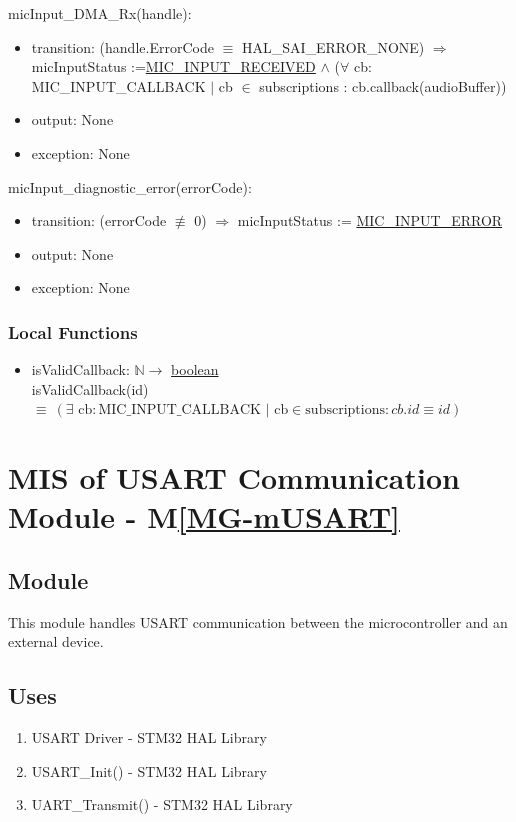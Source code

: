 \documentclass[12pt, titlepage]{article}
\newcommand{\mref}[1]{M\ref{#1}}
\begin{document}
\noindent micInput\_DMA\_Rx(handle):
\begin{itemize}
  \item transition: (handle.ErrorCode \(\equiv\) HAL\_SAI\_ERROR\_NONE)
  \(\Rightarrow\) \\
  micInputStatus :=\hyperref[enum:MicInputStatus:Received]{MIC\_INPUT\_RECEIVED}
  \(\wedge\) (\(\forall\) cb:
  MIC\_INPUT\_CALLBACK \(\vert\) cb \(\in\) subscriptions :
  cb.callback(audioBuffer))
  \item output: None
  \item exception: None
\end{itemize}

\noindent micInput\_diagnostic\_error(errorCode):
\begin{itemize}
  \item transition: (errorCode \(\not\equiv\) 0) \(\Rightarrow\) micInputStatus
  := \hyperref[enum:MicInputStatus:Error]{MIC\_INPUT\_ERROR}
  \item output: None
  \item exception: None
\end{itemize} 


\subsubsection{Local Functions}
\begin{itemize}
  \item isValidCallback: \(\mathbb{N} \rightarrow\)
  \hyperref[generic:bool]{boolean}\\
  isValidCallback(id) \(\equiv\ (\exists \text{ cb}: \text{MIC\_INPUT\_CALLBACK
  } \vert  
  \text{ cb} \in \text{subscriptions} : cb.id \equiv id)\) 
\end{itemize}

\newpage

\section{MIS of USART Communication Module \label{mod:UsartComm} -
\mref{MG-mUSART}}
\subsection{Module}
This module handles USART communication between the microcontroller and an
external device.

\subsection{Uses}
\begin{enumerate}
  \item USART Driver - STM32 HAL Library \cite{STM_USER_MANUAL}
  \item USART\_Init() - STM32 HAL Library \cite{STM_USER_MANUAL}
  \item UART\_Transmit() - STM32 HAL Library \cite{STM_USER_MANUAL}
\end{enumerate}
\end{document}
